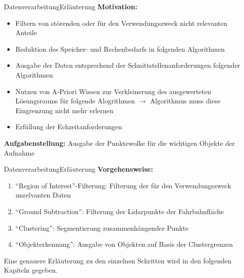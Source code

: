 \documentclass[169, handout	]{THIbeamer} %
\begin{document}
	\begin{frame}{Datenverarbeitung}{Erläuterung}
		\textbf{Motivation:} 
		\begin{itemize}
			\item Filtern von störenden oder für den Verwendungszweck nicht relevanten Anteile
			\item Reduktion des Speicher- und Rechenbedarfs in folgenden Algorithmen
			\item Ausgabe der Daten entsprechend der Schnittstellenanforderungen folgender Algorithmen
			\item Nutzen von A-Priori Wissen zur Verkleinerung des ausgewerteten Lösungsraums für folgende Alogrithmen $\rightarrow$ Algorithmus muss diese Eingrenzung nicht mehr erlernen
			\item Erfüllung der Echzeitanforderungen
		\end{itemize}
		\textbf{Aufgabenstellung:} Ausgabe der Punktewolke für die wichtigen Objekte der Aufnahme
	\end{frame}
	\begin{frame}{Datenverarbeitung}{Erläuterung}
		\textbf{Vorgehensweise:} 
		\begin{enumerate}
			\item \enquote{Region of Interest}-Filterung: Filterung der für den Verwendungszweck unrelvanten Daten
			\item \enquote{Ground Subtraction}: Filterung der Lidarpunkte der Fahrbahnfläche
			\item \enquote{Clustering}: Segmentierung zusammenhängender Punkte 
			\item \enquote{Objekterkennung}: Ausgabe von Objekten auf Basis der Clustergrenzen
		\end{enumerate}
		\vspace{0.5cm}
		Eine genauere Erläuterung zu den einzelnen Schritten wird in den folgenden Kapiteln gegeben.
	\end{frame}	
\end{document}
